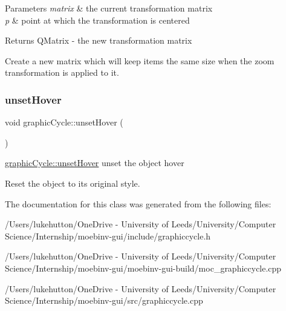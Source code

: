 \begin{DoxyParams}{Parameters}
{\em matrix} & the current transformation matrix \\
\hline
{\em p} & point at which the transformation is centered \\
\hline
\end{DoxyParams}
\begin{DoxyReturn}{Returns}
Q\+Matrix -\/ the new transformation matrix
\end{DoxyReturn}
Create a new matrix which will keep items the same size when the zoom transformation is applied to it. \mbox{\label{classgraphic_cycle_a7d9d805ccc83dcf16623c969ad48b6a5}} 
\subsubsection{\texorpdfstring{unset\+Hover}{unsetHover}}
{\footnotesize\ttfamily void graphic\+Cycle\+::unset\+Hover (\begin{DoxyParamCaption}{ }\end{DoxyParamCaption})\hspace{0.3cm}{\ttfamily [slot]}}



\mbox{\hyperlink{classgraphic_cycle_a7d9d805ccc83dcf16623c969ad48b6a5}{graphic\+Cycle\+::unset\+Hover}} unset the object hover 

Reset the object to its original style. 

The documentation for this class was generated from the following files\+:\begin{DoxyCompactItemize}
\item 
/\+Users/lukehutton/\+One\+Drive -\/ University of Leeds/\+University/\+Computer Science/\+Internship/moebinv-\/gui/include/graphiccycle.\+h\item 
/\+Users/lukehutton/\+One\+Drive -\/ University of Leeds/\+University/\+Computer Science/\+Internship/moebinv-\/gui/moebinv-\/gui-\/build/moc\+\_\+graphiccycle.\+cpp\item 
/\+Users/lukehutton/\+One\+Drive -\/ University of Leeds/\+University/\+Computer Science/\+Internship/moebinv-\/gui/src/graphiccycle.\+cpp\end{DoxyCompactItemize}
